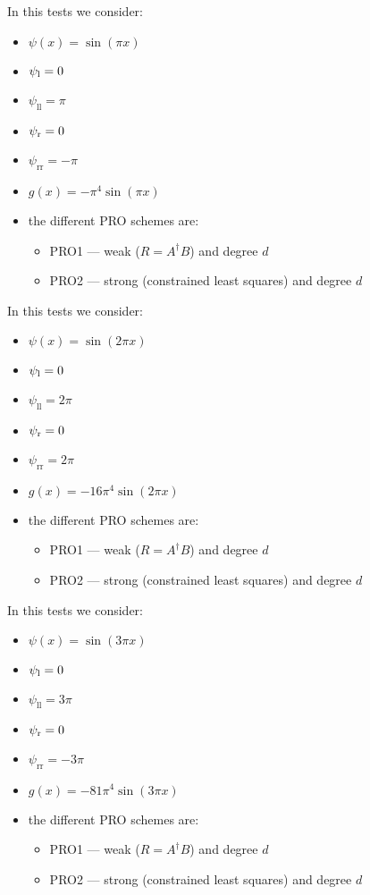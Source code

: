 \documentclass[11pt,a4paper]{article}
\author{}
\title{}
\theoremstyle{plain}
\theoremstyle{definition}
\begin{document}
In this tests we consider:
\begin{itemize}
\item $\psi(x)=\sin(\pi x)$
\item $\psi_\text l=0$
\item $\psi_\text{ll}=\pi$
\item $\psi_\text r=0$
\item $\psi_\text{rr}=-\pi$
\item $g(x)=-\pi^4\sin(\pi x)$
\item the different PRO schemes are:
	\begin{itemize}
	\item PRO1 --- weak ($R=A^\dagger B$) and degree $d$
	\item PRO2 --- strong (constrained least squares) and degree $d$
	\end{itemize}
\end{itemize}

In this tests we consider:
\begin{itemize}
\item $\psi(x)=\sin(2\pi x)$
\item $\psi_\text l=0$
\item $\psi_\text{ll}=2\pi$
\item $\psi_\text r=0$
\item $\psi_\text{rr}=2\pi$
\item $g(x)=-16\pi^4\sin(2\pi x)$
\item the different PRO schemes are:
	\begin{itemize}
	\item PRO1 --- weak ($R=A^\dagger B$) and degree $d$
	\item PRO2 --- strong (constrained least squares) and degree $d$
	\end{itemize}
\end{itemize}

In this tests we consider:
\begin{itemize}
\item $\psi(x)=\sin(3\pi x)$
\item $\psi_\text l=0$
\item $\psi_\text{ll}=3\pi$
\item $\psi_\text r=0$
\item $\psi_\text{rr}=-3\pi$
\item $g(x)=-81\pi^4\sin(3\pi x)$
\item the different PRO schemes are:
	\begin{itemize}
	\item PRO1 --- weak ($R=A^\dagger B$) and degree $d$
	\item PRO2 --- strong (constrained least squares) and degree $d$
	\end{itemize}
\end{itemize}

\end{document}
